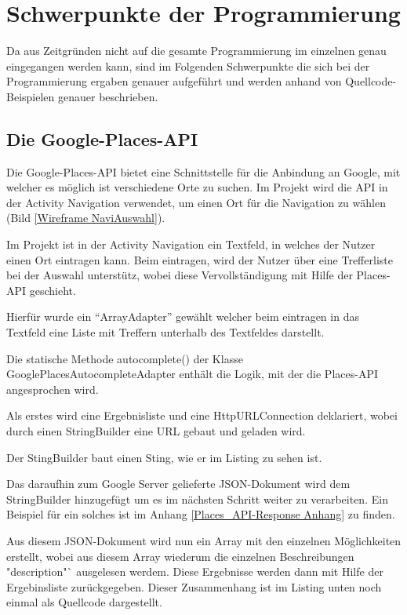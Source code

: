 \section{Schwerpunkte der Programmierung} \label{Schwerpunkte der Programmierung}
Da aus Zeitgr\"unden nicht auf die gesamte Programmierung im einzelnen genau eingegangen werden kann, sind im Folgenden Schwerpunkte die sich bei der Programmierung ergaben genauer aufgef\"uhrt und werden anhand von Quellcode-Beispielen genauer beschrieben.

\subsection{Die Google-Places-API}
Die Google-Places-\ac{API} bietet eine Schnittstelle f\"ur die Anbindung an Google, mit welcher es m\"oglich ist verschiedene Orte zu suchen. Im Projekt wird die \ac{API} in der Activity Navigation verwendet, um einen Ort f\"ur die Navigation zu w\"ahlen (Bild \ref{Wireframe NaviAuswahl}).

Im Projekt ist in der Activity Navigation ein Textfeld, in welches der Nutzer einen Ort eintragen kann. Beim eintragen, wird der Nutzer \"uber eine Trefferliste bei der Auswahl unterst\"utz, wobei diese Vervollst\"andigung mit Hilfe der Places-\ac{API} geschieht.

Hierf\"ur wurde ein "`ArrayAdapter"' gew\"ahlt welcher beim eintragen in das Textfeld eine Liste mit Treffern unterhalb des Textfeldes darstellt.

Die statische Methode autocomplete() der Klasse GooglePlacesAutocompleteAdapter enth\"alt die Logik, mit der die Places-\ac{API} angesprochen wird.

Als erstes wird eine Ergebnisliste und eine HttpURLConnection deklariert, wobei durch einen StringBuilder eine URL gebaut und geladen wird.

Der StingBuilder baut einen Sting, wie er im Listing zu sehen ist.


Das daraufhin zum Google Server gelieferte JSON-Dokument wird dem StringBuilder hinzugef\"ugt um es im n\"achsten Schritt weiter zu verarbeiten. Ein Beispiel f\"ur ein solches ist im Anhang \ref{Places_API-Response Anhang} zu finden.

Aus diesem JSON-Dokument wird nun ein Array mit den einzelnen M\"oglichkeiten erstellt, wobei aus diesem Array wiederum die einzelnen Beschreibungen "description"` ausgelesen werdem. Diese Ergebnisse werden dann mit Hilfe der Ergebinsliste zur\"uckgegeben. Dieser Zusammenhang ist im Listing unten noch einmal als Quellcode dargestellt.
\cite{PlacesAPIGoogle}

